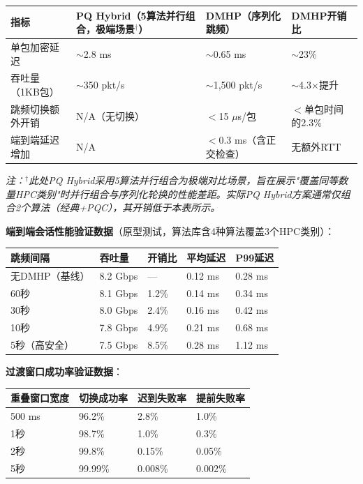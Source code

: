﻿\documentclass[12pt,a4paper]{article}
\begin{document}
{{\begin{center}
\begin{tabular}{|p{3.5cm}|p{3.5cm}|p{3.5cm}|p{3.5cm}|}
\hline
\textbf{指标} & \textbf{PQ Hybrid（5算法并行组合，极端场景$^{\dagger}$）} & \textbf{DMHP（序列化跳频）} & \textbf{DMHP开销比} \\
\hline
单包加密延迟 & $\sim$2.8 ms & $\sim$0.65 ms & $\sim$23\% \\
\hline
吞吐量（1KB包） & $\sim$350 pkt/s & $\sim$1,500 pkt/s & $\sim$4.3$\times$提升 \\
\hline
跳频切换额外开销 & N/A（无切换） & $<$15 $\mu$s/包 & $<$单包时间的2.3\% \\
\hline
端到端延迟增加 & N/A & $<$0.3 ms（含正交检查） & 无额外RTT \\
\hline
\end{tabular}
\end{center}
\textit{注：$^{\dagger}$此处PQ Hybrid采用5算法并行组合为极端对比场景，旨在展示"覆盖同等数量HPC类别"时并行组合与序列化轮换的性能差距。实际PQ Hybrid方案通常仅组合2个算法（经典+PQC），其开销低于本表所示。}

\textbf{端到端会话性能验证数据}（原型测试，算法库含4种算法覆盖3个HPC类别）：

\begin{center}

\begin{tabular}{|p{3.0cm}|p{2.5cm}|p{2.5cm}|p{2.5cm}|p{2.5cm}|}
\hline
\textbf{跳频间隔} & \textbf{吞吐量} & \textbf{开销比} & \textbf{平均延迟} & \textbf{P99延迟} \\
\hline
无DMHP（基线） & 8.2 Gbps & --- & 0.12 ms & 0.28 ms \\
\hline
60秒 & 8.1 Gbps & 1.2\% & 0.14 ms & 0.34 ms \\
\hline
30秒 & 8.0 Gbps & 2.4\% & 0.16 ms & 0.42 ms \\
\hline
10秒 & 7.8 Gbps & 4.9\% & 0.21 ms & 0.68 ms \\
\hline
5秒（高安全） & 7.5 Gbps & 8.5\% & 0.28 ms & 1.12 ms \\
\hline
\end{tabular}
\end{center}

\textbf{过渡窗口成功率验证数据}：

\begin{center}

\begin{tabular}{|p{3.0cm}|p{3.0cm}|p{3.0cm}|p{3.0cm}|}
\hline
\textbf{重叠窗口宽度} & \textbf{切换成功率} & \textbf{迟到失败率} & \textbf{提前失败率} \\
\hline
500 ms & 96.2\% & 2.8\% & 1.0\% \\
\hline
1秒 & 98.7\% & 1.0\% & 0.3\% \\
\hline
2秒 & 99.8\% & 0.15\% & 0.05\% \\
\hline
5秒 & 99.99\% & 0.008\% & 0.002\% \\
\hline
\end{tabular}
\end{center}

}}
\end{document}
